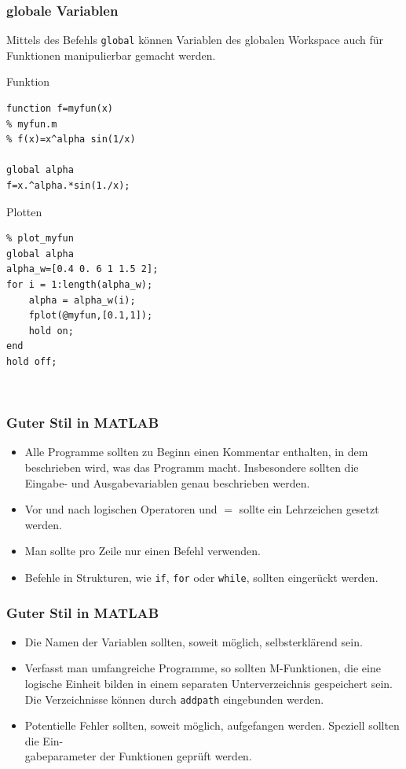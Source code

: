 %
%
\begin{frame}[fragile]\frametitle{globale Variablen}
Mittels des Befehls \alert{ \lstinline!global!} können Variablen des
globalen Workspace auch für
Funktionen manipulierbar gemacht werden.\\[0.6cm]
\begin{minipage}{5cm}
\alert{ Funktion}
\begin{lstlisting}
function f=myfun(x)
% myfun.m
% f(x)=x^alpha sin(1/x)

global alpha
f=x.^alpha.*sin(1./x);
\end{lstlisting}
\end{minipage} \hfill
\begin{minipage}{5cm}
\alert{ Plotten}
\begin{lstlisting}
% plot_myfun
global alpha
alpha_w=[0.4 0. 6 1 1.5 2];
for i = 1:length(alpha_w);
    alpha = alpha_w(i);
    fplot(@myfun,[0.1,1]);
    hold on;
end
hold off;
\end{lstlisting}
\end{minipage} \\
\end{frame}
%
%
\begin{frame}[fragile]\frametitle{Guter Stil in MATLAB}
\begin{itemize}
\item Alle Programme sollten zu Beginn einen Kommentar enthalten, in
  dem beschrieben wird, was das Programm macht. Insbesondere sollten
  die Eingabe- und Ausgabevariablen  genau beschrieben
  werden. 
\item Vor und nach logischen Operatoren und $=$ sollte ein Lehrzeichen
  gesetzt werden.
\item Man sollte pro Zeile nur einen Befehl verwenden.
\item Befehle in  Strukturen, wie  \lstinline!if!, \lstinline!for!
  oder \lstinline!while!, sollten eingerückt werden. 
\end{itemize}
\end{frame}
%
%
\begin{frame}[fragile]\frametitle{Guter Stil in MATLAB}
\begin{itemize}
\item Die Namen der Variablen sollten, soweit möglich, selbsterklärend
  sein.
\item Verfasst man umfangreiche Programme, so sollten M-Funktionen, die
  eine logische Einheit bilden in einem separaten Unterverzeichnis
  gespeichert sein. Die Verzeichnisse können durch \lstinline!addpath!
  eingebunden werden. 
\item Potentielle Fehler sollten, soweit möglich, aufgefangen
  werden. Speziell sollten die Ein- \\
 gabeparameter der Funktionen
  geprüft werden. 
\end{itemize}
\end{frame}

%
%
%



